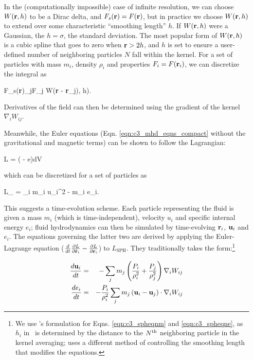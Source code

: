 \noindent In the (computationally impossible) case of infinite resolution, we can choose $W({\bf r}, h)$ to be a Dirac delta, and $F_s({\bf r}) = F({\bf r})$, but in practice we choose $W({\bf r}, h)$ to extend over some characteristic ``smoothing length'' $h$.  If $W({\bf r}, h)$ were a Gaussian, the $h = \sigma$, the standard deviation.  The most popular form of $W({\bf r}, h)$ is a cubic spline that goes to zero when ${\bf r} > 2h$, and $h$ is set to ensure a user-defined number of neighboring particles $N$ fall within the kernel.  For a set of particles with mass $m_i$, density $\rho_i$ and properties $F_i = F({\bf r}_i)$, we can discretize the integral as

\eqbegin
F_s({\bf r})\sum_jF_j W({\bf r} - {\bf r}_j), h).
\label{eq:c3_kernelavg}
\eqend

\noindent Derivatives of the field can then be determined using the gradient of the kernel $\nabla_i W_{ij}$.

Meanwhile, the Euler equations (Eqn. \ref{eqn:c3_mhd_eqns_compact} without the gravitational and magnetic terms) can be shown to follow the Lagrangian:

\eqbegin
L = \int \rho\left( - e\right)dV
\label{eqn:c3_lagrangian}
\eqend

\noindent which can be discretized for a set of particles as

\eqbegin
L_ = \sum_i m_i u_i^2 - m_i e_i.
\eqend

\noindent This suggests a time-evolution scheme.  Each particle representing the fluid is given a mass $m_i$ (which is time-independent), velocity $u_i$ and specific internal energy $e_i$; fluid hydrodynamics can then be simulated by time-evolving ${\bf r}_i$, ${\bf u}_i$ and $e_i$.  The equations governing the latter two are derived by applying the Euler-Lagrange equation ($\frac{d}{dt}\frac{\partial L}{\partial \dot{{\bf r}}_i} - \frac{\partial L}{\partial {\bf r}_i}$) to $L_\mathrm{SPH}$.  They traditionally takes the form:\footnote{We use \cite{wadssq04}'s formulation for Eqns. \ref{eqn:c3_spheqnm} and \ref{eqn:c3_spheqne}, as $h_i$ in \gasoline\ is determined by the distance to the $N^\mathrm{th}$ neighboring particle in the kernel averaging; \cite{spri10rev} uses a different method of controlling the smoothing length that modifies the equations.}

\begin{eqnarray}
\frac{d{\bf u}_i}{dt} &=& -\sum_j m_j\left(\frac{P_i}{\rho_i^2} + \frac{P_j}{\rho_j^2} \right)\nabla_i W_{ij} \\
\label{eqn:c3_spheqnm}
\frac{d e_i}{dt} &=& -\frac{P_i}{\rho_i^2}\sum_j m_j\left({\bf u}_{i} - {\bf u}_{j}\right)\cdot\nabla_i W_{ij}
\label{eqn:c3_spheqne}
\end{eqnarray}

